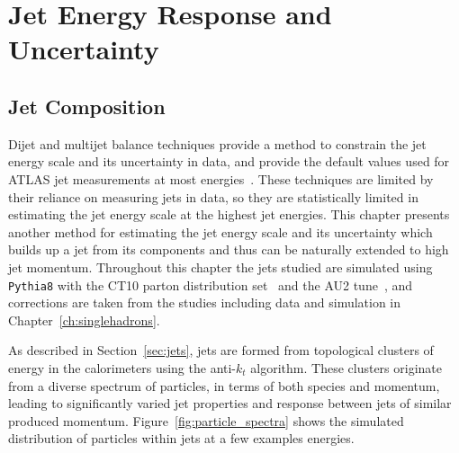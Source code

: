 \chapter{Jet Energy Response and Uncertainty}

\label{ch:jes}

\section{Jet Composition}

Dijet and multijet balance techniques provide a method to constrain the jet energy scale and its uncertainty in data, and provide the default values used for ATLAS jet measurements at most energies~\cite{PERF-2012-01}.
These techniques are limited by their reliance on measuring jets in data, so they are statistically limited in estimating the jet energy scale at the highest jet energies.
This chapter presents another method for estimating the jet energy scale and its uncertainty which builds up a jet from its components and thus can be naturally extended to high jet momentum.
Throughout this chapter the jets studied are simulated using \texttt{Pythia8} with the CT10 parton distribution set~\cite{CTEQ} and the AU2 tune~\cite{AU2}, and corrections are taken from the studies including data and simulation in Chapter~\ref{ch:singlehadrons}. 

As described in Section~\ref{sec:jets}, jets are formed from topological clusters of energy in the calorimeters using the anti-$k_t$ algorithm.
These clusters originate from a diverse spectrum of particles, in terms of both species and momentum, leading to significantly varied jet properties and response between jets of similar produced momentum.
Figure~\ref{fig:particle_spectra} shows the simulated distribution of particles within jets at a few examples energies.

